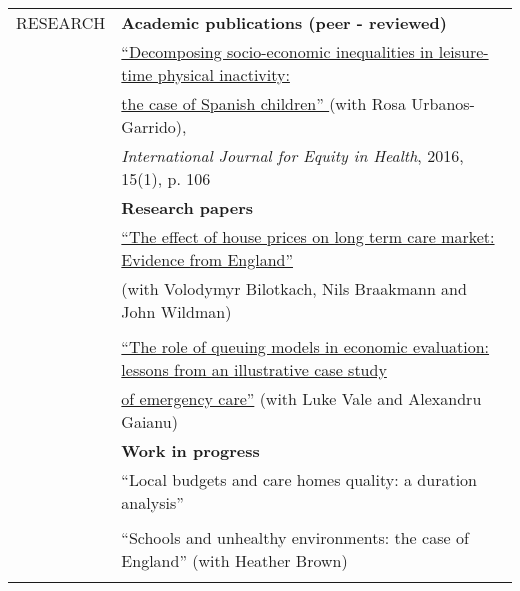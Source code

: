 \documentclass[letterpaper,11pt,oneside]{article}
\begin{document}
\begin{tabular}{@{} l l}
   
 \normalsize{RESEARCH }    & \textbf{Academic publications (peer - reviewed)} \\
    & \href{https://equityhealthj.biomedcentral.com/articles/10.1186/s12939-016-0394-9}{``Decomposing socio-economic inequalities in leisure-time physical inactivity:} \\
    & \href{https://equityhealthj.biomedcentral.com/articles/10.1186/s12939-016-0394-9}{the case of Spanish children'' }(with Rosa Urbanos-Garrido), \\
    &\textit{International Journal for Equity in Health}, 2016, 15(1), p. 106
  
      &\\
     & \textbf{Research papers} \\
     & \href{https://mpra.ub.uni-muenchen.de/81987/1/MPRA_paper_81987.pdf}{``The effect of house prices on long term care market: Evidence from England''} \\
   & (with Volodymyr Bilotkach, Nils Braakmann and John Wildman)\\
    &\\

   & \href{https://research.ncl.ac.uk/media/sites/researchwebsites/healtheconomicsgroup/HEG2015_03.pdf}{``The role of queuing models in economic evaluation: lessons from an illustrative case study}
    \\
   &\href{https://research.ncl.ac.uk/media/sites/researchwebsites/healtheconomicsgroup/HEG2015_03.pdf}{of emergency care''} (with Luke Vale and Alexandru Gaianu)}
    & \\
   & \textbf{Work in progress} \\
        & ``Local budgets and care homes quality: a duration analysis'' \\
    &\\
    
     & ``Schools and unhealthy environments: the case of England'' (with Heather Brown) \\
    &\\
  \end{tabular}
\newpage
\end{document}
